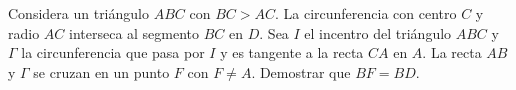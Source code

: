 Considera un triángulo $ABC$ con $BC>AC$. La circunferencia con centro $C$ y radio $AC$ interseca al segmento $BC$ en $D$. Sea $I$ el incentro del triángulo $ABC$ y $\Gamma$ la circunferencia que pasa por $I$ y es tangente a la recta $CA$ en $A$. La recta $AB$ y $\Gamma$ se cruzan en un punto $F$ con $F \neq A$. Demostrar que $BF=BD$.
